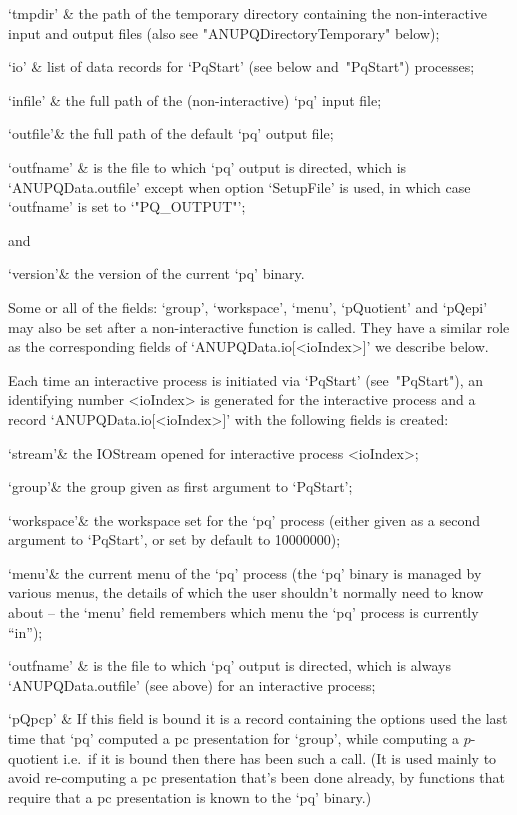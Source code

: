 \quad`tmpdir' & the  path  of  the  temporary  directory  containing  the
non-interactive   {\ANUPQ}   input   and   output   files    (also    see
"ANUPQDirectoryTemporary" below);

\quad`io' & list of data records for `PqStart' (see below  and~"PqStart")
processes;

\quad`infile' & the full path of the (non-interactive) `pq' input file;

\quad`outfile'& the full path of the default `pq' output  file;

\quad`outfname' & is the file to which `pq' output is directed, which  is
`ANUPQData.outfile' except when option `SetupFile' is used, in which case
`outfname' is set to `"PQ_OUTPUT"';

and

\quad`version'& the version of the current `pq' binary.

\enditems

Some or all of the fields: `group', `workspace', `menu', `pQuotient'  and
`pQepi' may also be set after  a  non-interactive  {\ANUPQ}  function  is
called.  They  have  a  similar  role  as  the  corresponding  fields  of
`ANUPQData.io[<ioIndex>]' we describe below.

Each time an interactive {\ANUPQ}  process  is  initiated  via  `PqStart'
(see~"PqStart"), an identifying number <ioIndex>  is  generated  for  the
interactive process  and  a  record  `ANUPQData.io[<ioIndex>]'  with  the
following fields is created:

\beginitems

\quad`stream'& the  IOStream  opened  for  interactive  {\ANUPQ}  process
<ioIndex>;

\quad`group'& the group given as first argument to `PqStart';

\quad`workspace'& the workspace set for the `pq' process (either given as
a second argument to `PqStart', or set by default to 10000000);

\quad`menu'& the current menu of the `pq' process  (the  `pq'  binary  is
managed by various  menus,  the  details  of  which  the  user  shouldn't
normally need to know about -- the `menu' field remembers which menu  the
`pq' process is currently ``in'');

\quad`outfname' & is the file to which `pq' output is directed, which  is
always `ANUPQData.outfile' (see above) for an interactive process;

\quad`pQpcp' & If this field is bound  it  is  a  record  containing  the
options used the last time that  `pq'  computed  a  pc  presentation  for
`group', while computing a $p$-quotient i.e.~if it is  bound  then  there
has been such a call. (It is used  mainly  to  avoid  re-computing  a  pc
presentation that's been done already, by functions that require  that  a
pc presentation is known to the `pq' binary.)

